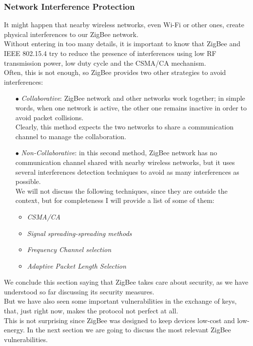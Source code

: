 \documentclass[12pt]{report}
\begin{document}
\subsubsection{Network Interference Protection}
\bigskip
It might happen that nearby wireless networks, even Wi-Fi or other ones, create physical interferences to our ZigBee network.\\
Without entering in too many details, it is important to know that ZigBee and IEEE 802.15.4 try to reduce the presence of interferences using low RF transmission power, low duty cycle and the CSMA/CA mechanism.\\
Often, this is not enough, so ZigBee provides two other strategies to avoid interferences:

\begin{itemize}
\setlength{\itemindent}{+4mm}
\item[$\bullet$] \emph{Collaborative}: ZigBee network and other networks work together; in simple words, when one network is active, the other one remains inactive in order to avoid packet collisions.\\
Clearly, this method expects the two networks to share a communication channel to manage the collaboration.

\item[$\bullet$] \emph{Non-Collaborative}: in this second method, ZigBee network has no communication channel shared with nearby wireless networks, but it uses several interferences detection techniques to avoid as many interferences as possible.\\
We will not discuss the following techniques, since they are outside the context, but for completeness I will provide a list of some of them:

\begin{itemize}
\setlength{\itemindent}{+4mm}
\item \emph{CSMA/CA}
\item \emph{Signal spreading-spreading methods}
\item \emph{Frequency Channel selection}
\item \emph{Adaptive Packet Length Selection}\\
\end{itemize}

\end{itemize}


We conclude this section saying that ZigBee takes care about security, as we have understood so far discussing its security measures.\\
But we have also seen some important vulnerabilities in the exchange of keys, that, just right now, makes the protocol not perfect at all.\\
This is not surprising since ZigBee was designed to keep devices low-cost and low-energy.
In the next section we are going to discuss the most relevant ZigBee vulnerabilities.
\end{document}
